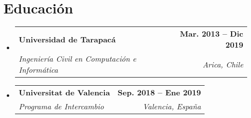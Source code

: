 \documentclass[letterpaper,11pt]{article}
\makeatletter
\newcommand{\resumeItem}[1]{
  \item\small{
    {#1 \vspace{-2pt}}
  }
}
\newcommand{\resumeSubheading}[4]{
  \vspace{-2pt}\item
    \begin{tabular*}{1.0\textwidth}[t]{l@{\extracolsep{\fill}}r}
      \textbf{#1} & \textbf{\small #2} \\
      \textit{\small#3} & \textit{\small #4} \\
    \end{tabular*}\vspace{-7pt}
}
\newcommand{\resumeProjectHeading}[2]{
    \item
    \begin{tabular*}{1.001\textwidth}{l@{\extracolsep{\fill}}r}
      \small#1 & \textbf{\small #2}\\
    \end{tabular*}\vspace{-7pt}
}
\newcommand{\resumeSubHeadingListStart}{\begin{itemize}[leftmargin=0.0in, label={}]}
\newcommand{\resumeSubHeadingListEnd}{\end{itemize}}
\newcommand{\resumeItemListStart}{\begin{itemize}}
\newcommand{\resumeItemListEnd}{\end{itemize}\vspace{-5pt}}
\makeatother
\begin{document}
\section{Educación}
  \resumeSubHeadingListStart
    \resumeSubheading
      {Universidad de Tarapacá}{Mar. 2013 -- Dic 2019}
      {Ingeniería Civil en Computación e Informática}{Arica, Chile}
    \resumeSubheading
      {Universitat de Valencia}{Sep. 2018 -- Ene 2019}
      {Programa de Intercambio}{Valencia, España}
  \resumeSubHeadingListEnd


\end{document}
